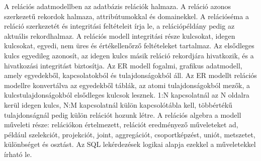 \begin{summarybox}
A relációs adatmodellben az adatbázis relációk halmaza. A reláció azonos szerkezetű rekordok halmaza, attribútumokkal és domainekkel. A relációséma a reláció szerkezetét és integritási feltételeit írja le, a relációpéldány pedig az aktuális rekordhalmaz. A relációs modell integritási része kulcsokat, idegen kulcsokat, egyedi, nem üres és értékellenőrző feltételeket tartalmaz. Az elsődleges kulcs egyedileg azonosít, az idegen kulcs másik reláció rekordjára hivatkozik, és a hivatkozási integritást biztosítja. Az ER modell fogalmi, grafikus adatmodell, amely egyedekből, kapcsolatokból és tulajdonságokból áll. Az ER modellt relációs modellre konvertálva az egyedekből táblák, az atomi tulajdonságokból mezők, a kulcstulajdonságokból elsődleges kulcsok lesznek. 1:N kapcsolatnál az N oldalra kerül idegen kulcs, N:M kapcsolatnál külön kapcsolótábla kell, többértékű tulajdonságnál pedig külön relációt hozunk létre. A relációs algebra a modell műveleti része: relációkon értelmezett, relációt eredményező műveleteket ad, például szelekciót, projekciót, joint, aggregációt, csoportképzést, uniót, metszetet, különbséget és osztást. Az SQL lekérdezések logikai alapja ezekkel a műveletekkel írható le.
\end{summarybox}
